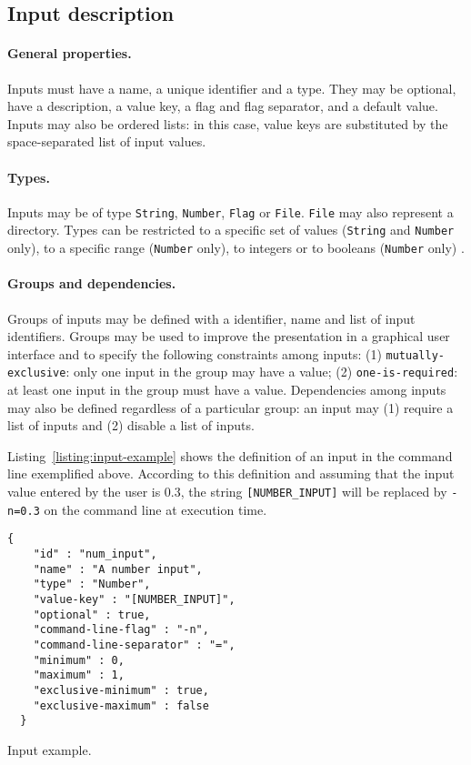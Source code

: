 \documentclass{article}
\begin{document}
\subsection{Input description}

\paragraph{General properties.} Inputs must have a name, a unique
identifier and a type. They may be optional, have a description, a
value key, a flag and flag separator, and a default value. Inputs may
also be ordered lists: in this case, value keys are substituted by the
space-separated list of input values.

\paragraph{Types.} Inputs may be of type \texttt{String},
\texttt{Number}, \texttt{Flag} %
or \texttt{File}. \texttt{File} may
also represent a directory. Types can be restricted to a specific set
of values (\texttt{String} %
and \texttt{Number} only), to a specific
range (\texttt{Number} only), to integers or to booleans (\texttt{Number}
only) %
.

\paragraph{Groups and dependencies.} Groups of inputs may be defined
with a identifier, name and list of input identifiers. Groups may be
used to improve the presentation in a graphical user interface and to
specify the following constraints among inputs: (1)
\texttt{mutually-exclusive}: only one input in the group may have a
value; (2) \texttt{one-is-required}: at least one input in the group
must have a value. Dependencies among inputs may also be defined
regardless of a particular group: an input may (1) require a list of
inputs and (2) disable a list of inputs.

Listing~\ref{listing:input-example} shows the definition of an input
in the command line exemplified above. According to this definition
and assuming that the input value entered by the user is 0.3, the
string \texttt{[NUMBER\_INPUT]} will be replaced by \texttt{-n=0.3} on
the command line at execution time.
\begin{listing}
\begin{verbatim}
{
    "id" : "num_input",
    "name" : "A number input",
    "type" : "Number",
    "value-key" : "[NUMBER_INPUT]",
    "optional" : true,
    "command-line-flag" : "-n",
    "command-line-separator" : "=",
    "minimum" : 0,
    "maximum" : 1,
    "exclusive-minimum" : true,
    "exclusive-maximum" : false
  }
\end{verbatim}
\caption{Input example.} 
\label{listing:input-example}
\end{listing}
\end{document}
